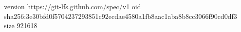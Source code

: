 version https://git-lfs.github.com/spec/v1
oid sha256:3e30bfd0f5704237293851c92ecdae4580a1fb8aac1aba8b8cc3066f90cd0df3
size 921618
